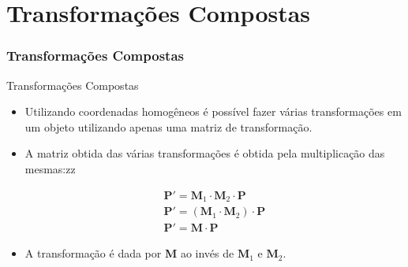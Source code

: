 \documentclass{beamer}
\begin{document}
\section{Transformações Compostas}
\begin{frame}
\frametitle{Transformações Compostas}
	\begin{block}{Transformações Compostas}
		\begin{itemize}
			\item<1-> Utilizando coordenadas homogêneos é possível fazer várias transformações em um objeto utilizando apenas uma matriz de transformação.
			\item<2-> A matriz obtida das várias transformações é obtida pela multiplicação das mesmas:zz
			
			\begin{eqnarray*}
				\textbf{P}' = \textbf{M}_1 \cdot \textbf{M}_2 \cdot \textbf{P} \\
				\textbf{P}' = ( \textbf{M}_1 \cdot \textbf{M}_2 ) \cdot \textbf{P} \\
				\textbf{P}' = \textbf{M} \cdot \textbf{P} 
			\end{eqnarray*}
				
		\item<2-> A transformação é dada por \textbf{M} ao invés de $\textbf{M}_1$ e $\textbf{M}_2$.
		\end{itemize}
	\end{block}
\end{frame}
\end{document}
